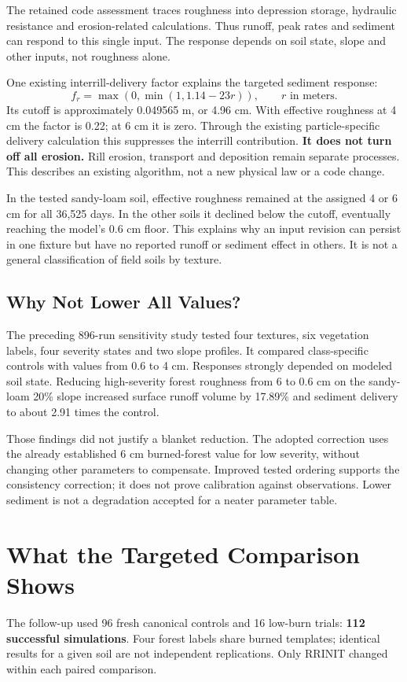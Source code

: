 The retained code assessment traces roughness into depression storage,
hydraulic resistance and erosion-related calculations. Thus runoff, peak rates
and sediment can respond to this single input. The response depends on soil
state, slope and other inputs, not roughness alone.\cite{assessment}

One existing interrill-delivery factor explains the targeted sediment response:
\[
 f_r=\max(0,\min(1,1.14-23r)),\qquad r\text{ in meters}.
\]
Its cutoff is approximately 0.049565 m, or 4.96 cm. With effective roughness
at 4 cm the factor is 0.22; at 6 cm it is zero. Through the existing
particle-specific delivery calculation this suppresses the interrill
contribution. \textbf{It does not turn off all erosion.} Rill erosion, transport
and deposition remain separate processes. This describes an existing algorithm,
not a new physical law or a code change.

In the tested sandy-loam soil, effective roughness remained at the assigned
4 or 6 cm for all 36,525 days. In the other soils it declined below the cutoff,
eventually reaching the model's 0.6 cm floor. This explains why an input revision
can persist in one fixture but have no reported runoff or sediment effect in
others. It is not a general classification of field soils by texture.\cite{targeted}

\subsection{Why Not Lower All Values?}
The preceding 896-run sensitivity study tested four textures, six vegetation
labels, four severity states and two slope profiles. It compared class-specific
controls with values from 0.6 to 4 cm. Responses strongly depended on modeled
soil state. Reducing high-severity forest roughness from 6 to 0.6 cm on the
sandy-loam 20\% slope increased surface runoff volume by 17.89\% and sediment
delivery to about 2.91 times the control.\cite{sensitivity}

Those findings did not justify a blanket reduction. The adopted correction
uses the already established 6 cm burned-forest value for low severity, without
changing other parameters to compensate. Improved tested ordering supports the
consistency correction; it does not prove calibration against observations.
Lower sediment is not a degradation accepted for a neater parameter table.

\clearpage
\section{What the Targeted Comparison Shows}
The follow-up used 96 fresh canonical controls and 16 low-burn trials:
\textbf{112 successful simulations}. Four forest labels share burned templates;
identical results for a given soil are not independent replications.
Only RRINIT changed within each paired comparison.\cite{targeted}

